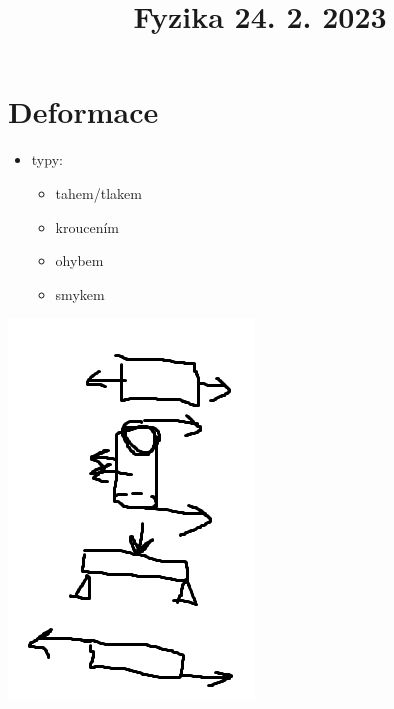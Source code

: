 \documentclass{article}
\title{\vspace{-2cm}Fyzika 24. 2. 2023\vspace{-1.7cm}}
\date{}
\author{}
\begin{document}
\maketitle

\part{Deformace}

  \begin{minipage}{0.25\textwidth}\raggedleft
    \begin{itemize}
      \item typy:
      \begin{itemize}
        \item tahem/tlakem
        \item kroucením
        \item ohybem
        \item smykem
      \end{itemize}
    \end{itemize}
  \end{minipage}
  \hspace{0.5cm}
  \noindent\begin{minipage}{0.12\textwidth}
    \includegraphics[width=0.9\linewidth]{deformace}
  \end{minipage}
\end{document}
